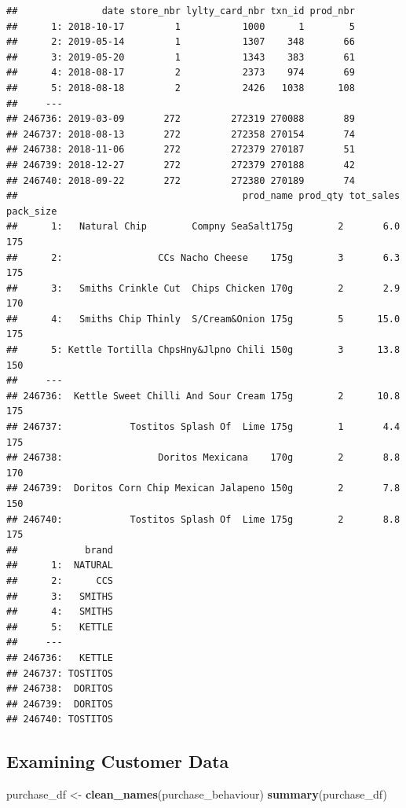 \documentclass[
]{article}
\newenvironment{Shaded}{\begin{snugshade}}{\end{snugshade}}
\newcommand{\FunctionTok}[1]{\textcolor[rgb]{0.13,0.29,0.53}{\textbf{#1}}}
\newcommand{\NormalTok}[1]{#1}
\newcommand{\OtherTok}[1]{\textcolor[rgb]{0.56,0.35,0.01}{#1}}
\begin{document}
\begin{verbatim}
##               date store_nbr lylty_card_nbr txn_id prod_nbr
##      1: 2018-10-17         1           1000      1        5
##      2: 2019-05-14         1           1307    348       66
##      3: 2019-05-20         1           1343    383       61
##      4: 2018-08-17         2           2373    974       69
##      5: 2018-08-18         2           2426   1038      108
##     ---                                                    
## 246736: 2019-03-09       272         272319 270088       89
## 246737: 2018-08-13       272         272358 270154       74
## 246738: 2018-11-06       272         272379 270187       51
## 246739: 2018-12-27       272         272379 270188       42
## 246740: 2018-09-22       272         272380 270189       74
##                                        prod_name prod_qty tot_sales pack_size
##      1:   Natural Chip        Compny SeaSalt175g        2       6.0       175
##      2:                 CCs Nacho Cheese    175g        3       6.3       175
##      3:   Smiths Crinkle Cut  Chips Chicken 170g        2       2.9       170
##      4:   Smiths Chip Thinly  S/Cream&Onion 175g        5      15.0       175
##      5: Kettle Tortilla ChpsHny&Jlpno Chili 150g        3      13.8       150
##     ---                                                                      
## 246736:  Kettle Sweet Chilli And Sour Cream 175g        2      10.8       175
## 246737:            Tostitos Splash Of  Lime 175g        1       4.4       175
## 246738:                 Doritos Mexicana    170g        2       8.8       170
## 246739:  Doritos Corn Chip Mexican Jalapeno 150g        2       7.8       150
## 246740:            Tostitos Splash Of  Lime 175g        2       8.8       175
##            brand
##      1:  NATURAL
##      2:      CCS
##      3:   SMITHS
##      4:   SMITHS
##      5:   KETTLE
##     ---         
## 246736:   KETTLE
## 246737: TOSTITOS
## 246738:  DORITOS
## 246739:  DORITOS
## 246740: TOSTITOS
\end{verbatim}

\hypertarget{examining-customer-data}{%
\subsection{Examining Customer Data}\label{examining-customer-data}}

\begin{Shaded}
\begin{Highlighting}[]
\NormalTok{purchase\_df }\OtherTok{\textless{}{-}} \FunctionTok{clean\_names}\NormalTok{(purchase\_behaviour)}
\FunctionTok{summary}\NormalTok{(purchase\_df)}
\end{Highlighting}
\end{Shaded}
\end{document}

